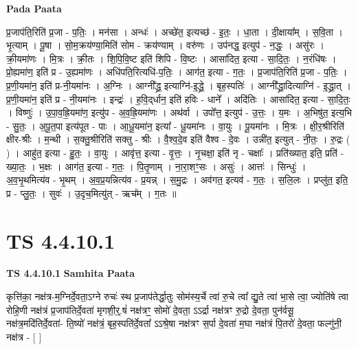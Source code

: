 \documentclass[17pt]{extarticle}
\begin{document}
\textbf{Pada Paata} \newline

प्र॒जाप॑ति॒रिति॑ प्र॒जा - प॒तिः॒ । मन॑सा । अन्धः॑ । अच्छे॑त॒ इत्यच्छ॑ - इ॒तः॒ । धा॒ता । दी॒क्षाया᳚म् । स॒वि॒ता । भृ॒त्याम् । पू॒षा । सो॒म॒क्रय॑ण्या॒मिति॑ सोम - क्रय॑ण्याम् । वरु॑णः । उप॑नद्ध॒ इत्युप॑ - न॒द्धः॒ । असु॑रः । क्री॒यमा॑णः । मि॒त्रः । क्री॒तः । शि॒पि॒वि॒ष्ट इति॑ शिपि - वि॒ष्टः । आसा॑दित॒ इत्या - सा॒दि॒तः॒ । न॒रंधि॑षः । प्रो॒ह्यमा॑ण॒ इति॑ प्र - उ॒ह्यमा॑णः । अधि॑पति॒रित्यधि॑-प॒तिः॒ । आग॑त॒ इत्या - ग॒तः॒ । प्र॒जाप॑ति॒रिति॑ प्र॒जा - प॒तिः॒ । प्र॒णी॒यमा॑न॒ इति॑ प्र-नी॒यमा॑नः । अ॒ग्निः । आग्नी᳚द्ध्र॒ इत्याग्नि॑-इ॒द्ध्रे॒ । बृह॒स्पतिः॑ । आग्नी᳚द्ध्रा॒दित्याग्नि॑ - इ॒द्ध्रा॒त् । प्र॒णी॒यमा॑न॒ इति॑ प्र - नी॒यमा॑नः । इन्द्रः॑ । ह॒वि॒द्‌र्धान॒ इति॑ हविः - धाने᳚ । अदि॑तिः । आसा॑दित॒ इत्या - सा॒दि॒तः॒ । विष्णुः॑ । उ॒पा॒व॒ह्रि॒यमा॑ण॒ इत्यु॑प - अ॒व॒ह्रि॒यमा॑णः । अथ॑र्वा । उपो᳚त्त॒ इत्युप॑ - उ॒त्तः॒ । य॒मः । अ॒भिषु॑त॒ इत्य॒भि - सु॒तः॒ । अ॒पू॒त॒पा इत्य॑पूत - पाः । आ॒धू॒यमा॑न॒ इत्या᳚ - धू॒यमा॑नः । वा॒युः । पू॒यमा॑नः । मि॒त्रः । क्षी॒र॒श्रीरिति॑ क्षीर-श्रीः । म॒न्थी । स॒क्तु॒श्रीरिति॑ सक्तु - श्रीः । वै॒श्व॒दे॒व इति॑ वैश्व - दे॒वः । उन्नी॑त॒ इत्युत् - नी॒तः॒ । रु॒द्रः ( ) । आहु॑त॒ इत्या - हु॒तः॒ । वा॒युः । आवृ॑त्त॒ इत्या - वृ॒त्तः॒ । नृ॒चक्षा॒ इति॑ नृ - चक्षाः᳚ । प्रति॑ख्यात॒ इति॒ प्रति॑ - ख्या॒तः॒ । भ॒क्षः । आग॑त॒ इत्या - ग॒तः॒ । पि॒तृ॒णाम् । ना॒रा॒शꣳ॒॒सः । असुः॑ । आत्तः॑ । सिन्धुः॑ । अ॒व॒भृ॒थमित्य॑व - भृ॒थम् । अ॒व॒प्र॒यन्नित्य॑व - प्र॒यन्न् । स॒मु॒द्रः । अव॑गत॒ इत्यव॑ - ग॒तः॒ । स॒लि॒लः । प्रप्लु॑त॒ इति॒ प्र - प्लु॒तः॒ । सुवः॑ । उ॒दृच॒मित्यु॑त् - ऋच᳚म् । ग॒तः ॥  \newline





\section{ TS 4.4.10.1 }

\textbf{TS 4.4.10.1 } \newline
\textbf{Samhita Paata} \newline

कृत्ति॑का॒ नक्ष॑त्र-म॒ग्निर्दे॒वता॒ऽग्ने रुचः॑ स्थ प्र॒जाप॑तेर्द्धा॒तुः सोम॑स्य॒र्चे त्वा॑ रु॒चे त्वा᳚ द्यु॒ते त्वा॑ भा॒से त्वा॒ ज्योति॑षे त्वा रोहि॒णी नक्ष॑त्रं प्र॒जाप॑तिर्दे॒वता॑ मृगशी॒र्॒.षं॑ नक्ष॑त्रꣳ॒॒ सोमो॑ दे॒वता॒ ऽऽर्द्रा नक्ष॑त्रꣳ रु॒द्रो दे॒वता॒ पुन॑र्वसू॒ नक्ष॑त्र॒मदि॑तिर्दे॒वता॑- ति॒ष्यो॑ नक्ष॑त्रं॒ बृह॒स्पति॑र्दे॒वता᳚ ऽऽश्रे॒षा नक्ष॑त्रꣳ स॒र्पा दे॒वता॑ म॒घा नक्ष॑त्रं पि॒तरो॑ दे॒वता॒ फल्गु॑नी॒ नक्ष॑त्र - [  ] \newline
\end{document}
